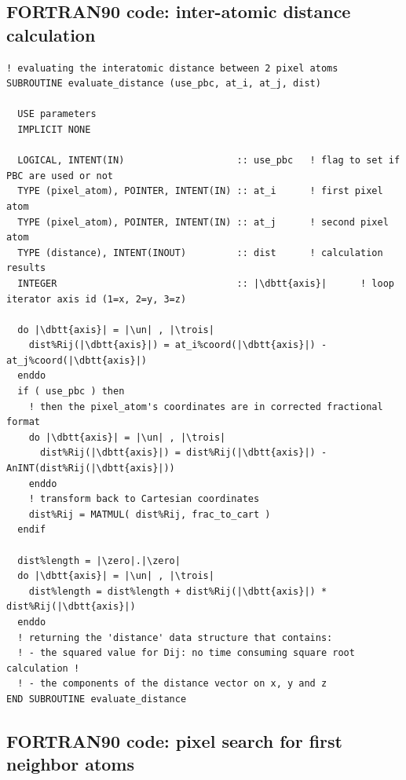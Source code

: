 \subsection{FORTRAN90 code: inter-atomic distance calculation}

\begin{lstlisting}[language={[90]FORTRAN}]
! evaluating the interatomic distance between 2 pixel atoms
SUBROUTINE evaluate_distance (use_pbc, at_i, at_j, dist)
  
  USE parameters
  IMPLICIT NONE
  
  LOGICAL, INTENT(IN)                    :: use_pbc   ! flag to set if PBC are used or not
  TYPE (pixel_atom), POINTER, INTENT(IN) :: at_i      ! first pixel atom
  TYPE (pixel_atom), POINTER, INTENT(IN) :: at_j      ! second pixel atom
  TYPE (distance), INTENT(INOUT)         :: dist      ! calculation results
  INTEGER                                :: |\dbtt{axis}|      ! loop iterator axis id (1=x, 2=y, 3=z)
  
  do |\dbtt{axis}| = |\un| , |\trois|
    dist%Rij(|\dbtt{axis}|) = at_i%coord(|\dbtt{axis}|) - at_j%coord(|\dbtt{axis}|)
  enddo
  if ( use_pbc ) then
    ! then the pixel_atom's coordinates are in corrected fractional format
    do |\dbtt{axis}| = |\un| , |\trois|
      dist%Rij(|\dbtt{axis}|) = dist%Rij(|\dbtt{axis}|) - AnINT(dist%Rij(|\dbtt{axis}|))
    enddo
    ! transform back to Cartesian coordinates
    dist%Rij = MATMUL( dist%Rij, frac_to_cart )
  endif
  
  dist%length = |\zero|.|\zero|
  do |\dbtt{axis}| = |\un| , |\trois|
    dist%length = dist%length + dist%Rij(|\dbtt{axis}|) * dist%Rij(|\dbtt{axis}|)
  enddo
  ! returning the 'distance' data structure that contains:
  ! - the squared value for Dij: no time consuming square root calculation !
  ! - the components of the distance vector on x, y and z
END SUBROUTINE evaluate_distance
\end{lstlisting}

\clearpage

\subsection{FORTRAN90 code: pixel search for first neighbor atoms}
\label{f-pc-pixel}

